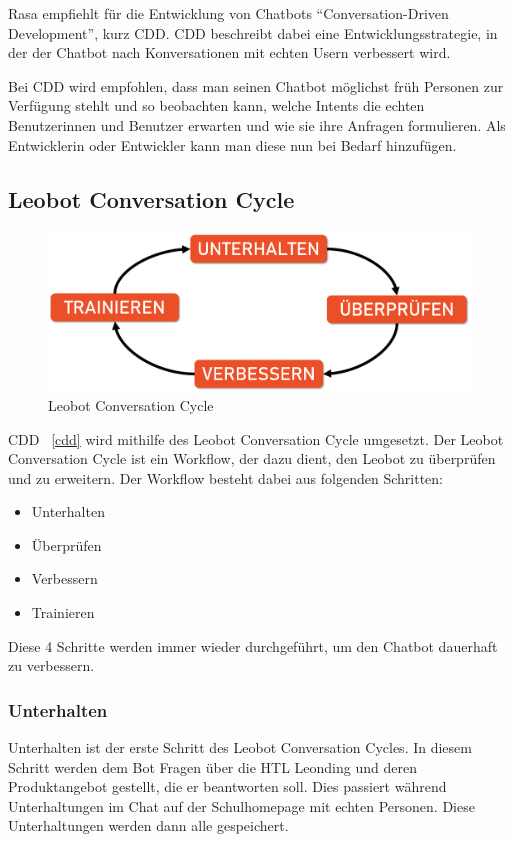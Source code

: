Rasa empfiehlt für die Entwicklung von Chatbots ``Conversation-Driven Development'', kurz CDD.\cite{cdd}
CDD beschreibt dabei eine Entwicklungsstrategie, in der der Chatbot nach Konversationen mit echten Usern verbessert wird.

Bei CDD wird empfohlen, dass man seinen Chatbot möglichst früh Personen zur Verfügung stehlt und so beobachten kann, welche Intents die echten Benutzerinnen und Benutzer erwarten und wie sie ihre Anfragen formulieren.
Als Entwicklerin oder Entwickler kann man diese nun bei Bedarf hinzufügen.


\subsection{Leobot Conversation Cycle}\label{subsec:leobot-conversation-cycle}

\begin{figure}[hbt!]
    \centering
    \includegraphics[scale=0.2]{pics/LeoCircle}
    \caption{Leobot Conversation Cycle}
    \label{fig:impl:ConversationCycle}
\end{figure}

CDD ~\ref{cdd} wird mithilfe des Leobot Conversation Cycle umgesetzt.
Der Leobot Conversation Cycle ist ein Workflow, der dazu dient, den Leobot zu überprüfen und zu erweitern.
Der Workflow besteht dabei aus folgenden Schritten:

\begin{itemize}
    \item Unterhalten
    \item Überprüfen
    \item Verbessern
    \item Trainieren
\end{itemize}

Diese 4 Schritte werden immer wieder durchgeführt, um den Chatbot dauerhaft zu verbessern.

\subsubsection{Unterhalten}
Unterhalten ist der erste Schritt des Leobot Conversation Cycles.
In diesem Schritt werden dem Bot Fragen über die HTL Leonding und deren Produktangebot gestellt, die er beantworten soll.
Dies passiert während Unterhaltungen im Chat auf der Schulhomepage mit echten Personen.
Diese Unterhaltungen werden dann alle gespeichert.

